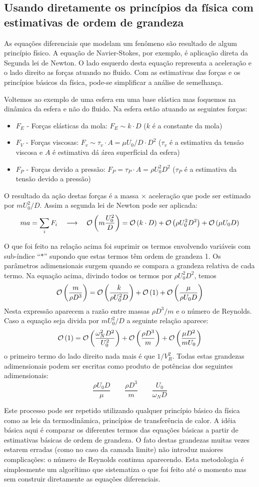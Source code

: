 \subsection{Usando diretamente os princípios da física com estimativas de ordem de grandeza}
As equações diferenciais que modelam um fenômeno são resultado de algum princípio físico. A equação de Navier-Stokes, por exemplo, é aplicação direta da Segunda lei de Newton. O lado esquerdo desta equação representa a aceleração e o lado direito as forças atuando no fluido. Com as estimativas das forças e os princípios básicos da física, pode-se simplificar a análise de semelhança. 

Voltemos ao exemplo de uma esfera em uma base elástica mas foquemos na dinâmica da esfera e não do fluido. Na esfera estão atuando as seguintes forças:
\begin{itemize}
\item $F_E$ - Forças elásticas da mola: $F_E \sim k\cdot D$ ($k$ é a constante da mola)
\item $F_V$ - Forças viscosas: $F_v \sim \tau_v \cdot A = \mu U_0/D \cdot D^2$ ($\tau_v$ é a estimativa da tensão viscosa e $A$ é estimativa dá área superfícial da esfera)
\item $F_P$ - Forças devido a pressão: $F_P = \tau_P \cdot A = \rho U_0^2 D^2$ ($\tau_P$ é a estimativa da tensão devido a pressão)
\end{itemize}
O resultado da ação destas forças é a massa $\times$ aceleração que pode ser estimado por $mU_0^2/D$. Assim a segunda lei de Newton pode ser aplicada:
\[
ma = \sum_i F_i \quad\longrightarrow\quad \mathcal{O}\left(m\frac{U_0^2}{D}\right) = \mathcal{O}\left(k\cdot D\right) + \mathcal{O}\left(\rho U_0^2 D^2\right) + \mathcal{O}\left(\mu U_0 D\right)
\]

O que foi feito na relação acima foi suprimir os termos envolvendo variáveis com sub-índice ``$*$'' supondo que estas termos têm ordem de grandeza 1. Os parâmetros adimensionais surgem quando se compara a grandeza relativa de cada termo. Na equação acima, divindo todos os termos por $\rho U_0^2 D^2$, temos
\[
\mathcal{O}\left(\frac{m}{\rho D^3}\right) = \mathcal{O}\left(\frac{k}{\rho U_0^2 D}\right) + \mathcal{O}\left(1\right) + \mathcal{O}\left(\frac{\mu}{\rho U_0 D}\right)
\]
Nesta expressão aparecem a razão entre massas $\rho D^3/m$ e o número de Reynolds. Caso a equação seja divida por $m U_0^2/D$ a seguinte relação aparece:
\[
\mathcal{O}\left(1\right) = \mathcal{O}\left(\frac{\omega_N^2 D^2}{U_0^2}\right) + \mathcal{O}\left(\frac{\rho D^3}{m}\right) + \mathcal{O}\left(\frac{\mu D^2}{m U_0}\right)
\]
o primeiro termo do lado direito nada mais é que $1/V_R^2$. Todas estas grandezas adimensionais podem ser escritas como produto de potências dos seguintes adimensionais:
\[
\frac{\rho U_0 D}{\mu} \qquad \frac{\rho D^3}{m} \qquad \frac{U_0}{\omega_N D}
\]

Este processo pode ser repetido utilizando qualquer princípio básico da física como as leis da termodinâmica, princípios de transferência de calor. A idéia básica aqui é comparar os diferentes termos das equações básicas a partir de estimativas básicas de ordem de grandeza. O fato destas grandezas muitas vezes estarem erradas (como no caso da camada limite) não introduz maiores complicações: o número de Reynolds continua aparecendo. Esta metodologia é simplesmente um algorítimo que sistematiza o que foi feito até o momento mas sem construir diretamente as equações diferenciais.

